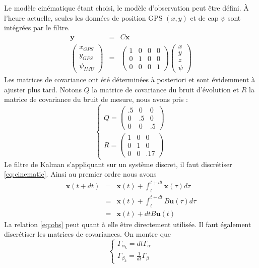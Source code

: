 \documentclass[12pt]{report}
\begin{document}
Le modèle cinématique étant choisi, le modèle d'observation peut être défini. À l'heure actuelle, seules les données de position GPS $(x, y)$ et de cap $\psi$ sont intégrées par le filtre.
\begin{eqnarray}
  \mathbf{y} & = & C \mathbf{x} \nonumber\\
  \label{eq:obs} \left( \begin{array}{c}
    x_{GPS}\\
    y_{GPS}\\
    \psi_{IMU}
  \end{array} \right) & = & \left( \begin{array}{cccc}
    1 & 0 & 0 & 0\\
    0 & 1 & 0 & 0\\
    0 & 0 & 0 & 1
  \end{array} \right) \left( \begin{array}{c}
    x\\
    y\\
    z\\
    \psi
  \end{array} \right) 
\end{eqnarray}
Les matrices de covariance ont été déterminées à posteriori et sont évidemment à ajuster plus tard. Notons $Q$ la matrice de covariance du bruit d'évolution et $R$ la matrice de covariance du bruit de mesure, nous avons pris :
\[ \left\{ \begin{array}{c}
     Q = \left( \begin{array}{ccc}
       .5 & 0 & 0\\
       0 & .5 & 0\\
       0 & 0 & .5
     \end{array} \right)\\
     R = \left( \begin{array}{ccc}
       1 & 0 & 0\\
       0 & 1 & 0\\
       0 & 0 & .17
     \end{array} \right)
   \end{array} \right. \]
Le filtre de Kalman s'appliquant sur un système discret, il faut discrétiser \eqref{eq:cinematic}. Ainsi au premier ordre nous avons
\begin{eqnarray}
  \mathbf{x} (t + dt) & = & \mathbf{x} (t) + \int_t^{t + dt}
  \dot{\mathbf{x}} (\tau) d \tau \nonumber\\
  & = & \mathbf{x} (t) + \int_t^{t + dt} B \mathbf{u} (\tau) d
  \tau \nonumber\\
  & = & \mathbf{x} (t) + dt B \mathbf{u} (t) \nonumber
\end{eqnarray}
La relation \eqref{eq:obs} peut quant à elle être directement utilisée. Il faut également discrétiser les matrices de covariances. On montre que
\[ \left\{ \begin{array}{c}
     \Gamma_{\alpha_k} = dt \Gamma_{\alpha}\\
     \Gamma_{\beta_k} = \frac{1}{dt} \Gamma_{\beta}
   \end{array} \right. \]
\end{document}
